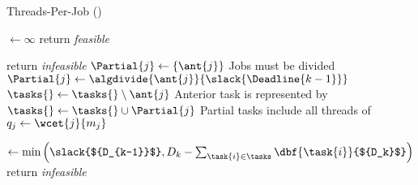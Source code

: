 \begin{algorithm}[H]
  \caption{Threads-Per-Job (\tpj{})}\label{alg:tpj}
  \begin{algorithmic}[1]
    \State {} ${\gets \infty}$
     \label{line:begin-for}
       \label{line:infeasible-1}
        \State return \emph{feasible}
      \EndIf
 
            \label{line:bnc-mod-start}
      \label{line:minq-start}
        \State return \emph{infeasible} \label{line:no-slack-infease}
        \EndIf \label{line:minq-end}
      \State ${\Partial{j} \gets \{\ant{j}\}}$
      \label{line:rem-p1}
        \Comment Jobs must be divided
          \State ${\Partial{j} \gets \algdivide{\ant{j}}{\slack{\Deadline{k-1}}}}$
          \label{line:divide}
          \State ${\tasks{} \gets \tasks{} \setminus \ant{j}}$
          \Comment Anterior task  is represented by 
          \State ${\tasks{} \gets \tasks{} \cup \Partial{j}}$
          \Comment Partial tasks include all threads of 
      \EndIf \label{line:rem-p2}
          \State ${q_j \gets \wcet{j}{m_j}}$
      \EndFor
      \EndFor \label{line:the-same}
      \label{line:bnc-mod-end}
      
      \State {} ${\gets \min
        \left(
          \slack{${D_{k-1}}$}, D_k - \sum_{\task{i} \in \tasks}
          \dbf{\task{i}}{${D_k}$}
        \right)
      }$ \label{line:same-deadline}
       \label{line:infeasible-2}
        \State return \emph{infeasible} \label{line:more-demand}
      \EndIf
    \EndFor
  \end{algorithmic}
\end{algorithm}
